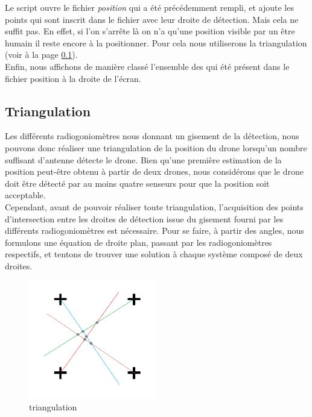Le script ouvre le fichier \textit{position} qui a été précédemment rempli, et ajoute les points qui sont inscrit dans le fichier avec leur droite de détection. Mais cela ne suffit pas. En effet, si l'on s'arrête là on n'a qu'une position visible par un être humain il reste encore à la positionner. Pour cela nous utiliserons la triangulation (voir à la page \ref{sec:trian}).
~\\

Enfin, nous affichons de manière classé l'ensemble des \rpi qui été présent dans le fichier position à la droite de l'écran.




\subsection{Triangulation}
\label{sec:trian}
Les différents radiogoniomètres nous donnant un gisement de la détection, nous pouvons donc
réaliser une triangulation de la position du drone lorsqu’un nombre suffisant d’antenne détecte le
drone. Bien qu’une première estimation de la position peut-être obtenu à partir de deux drones,
nous considérons que le drone doit être détecté par au moins quatre senseurs pour que la position
soit acceptable.
~\\

Cependant, avant de pouvoir réaliser toute triangulation, l’acquisition des points d’intersection entre
les droites de détection issue du gisement fourni par les différents radiogoniomètres est nécessaire.
Pour se faire, à partir des angles, nous formulons une équation de droite plan, passant par les
radiogoniomètres respectifs, et tentons de trouver une solution à chaque système composé de deux
droites.
~\\

\begin{figure}

  \includegraphics[width=0.5\textwidth]{triangulation1}
  \caption{triangulation}
\end{figure}


